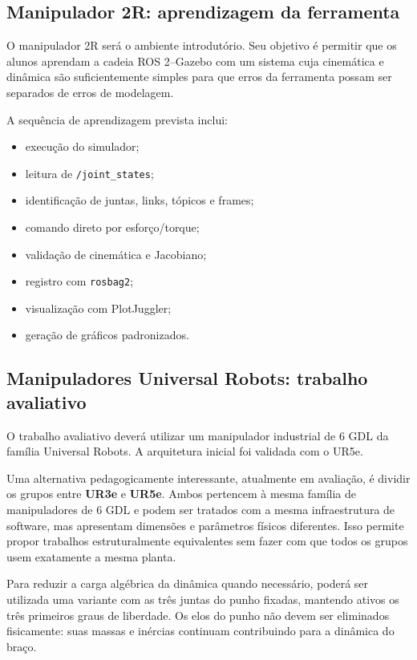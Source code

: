 \documentclass[11pt,a4paper]{article}
\begin{document}
\subsection{Manipulador 2R: aprendizagem da ferramenta}

O manipulador 2R será o ambiente introdutório. Seu objetivo é permitir que os alunos aprendam a cadeia ROS 2--Gazebo com um sistema cuja cinemática e dinâmica são suficientemente simples para que erros da ferramenta possam ser separados de erros de modelagem.

A sequência de aprendizagem prevista inclui:
\begin{itemize}
  \item execução do simulador;
  \item leitura de \texttt{/joint\_states};
  \item identificação de juntas, links, tópicos e frames;
  \item comando direto por esforço/torque;
  \item validação de cinemática e Jacobiano;
  \item registro com \texttt{rosbag2};
  \item visualização com PlotJuggler;
  \item geração de gráficos padronizados.
\end{itemize}

\subsection{Manipuladores Universal Robots: trabalho avaliativo}

O trabalho avaliativo deverá utilizar um manipulador industrial de 6 GDL da família Universal Robots. A arquitetura inicial foi validada com o UR5e.

Uma alternativa pedagogicamente interessante, atualmente em avaliação, é dividir os grupos entre \textbf{UR3e} e \textbf{UR5e}. Ambos pertencem à mesma família de manipuladores de 6 GDL e podem ser tratados com a mesma infraestrutura de software, mas apresentam dimensões e parâmetros físicos diferentes. Isso permite propor trabalhos estruturalmente equivalentes sem fazer com que todos os grupos usem exatamente a mesma planta.

Para reduzir a carga algébrica da dinâmica quando necessário, poderá ser utilizada uma variante com as três juntas do punho fixadas, mantendo ativos os três primeiros graus de liberdade. Os elos do punho não devem ser eliminados fisicamente: suas massas e inércias continuam contribuindo para a dinâmica do braço.
\end{document}
